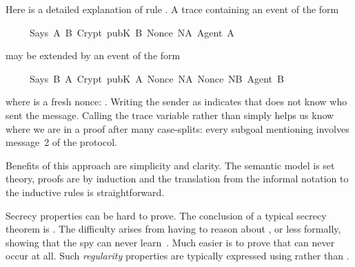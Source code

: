 \begin{isabellebody}
\begin{isamarkuptext}
Here is a detailed explanation of rule .
A trace containing an event of the form
\begin{isabelle}%
\ \ \ \ \ Says\ A{}\ B\ {}Crypt\ {}pubK\ B{}\ {}Nonce\ NA{}\ Agent\ A{}{}%
\end{isabelle}
may be extended by an event of the form
\begin{isabelle}%
\ \ \ \ \ Says\ B\ A\ {}Crypt\ {}pubK\ A{}\ {}Nonce\ NA{}\ Nonce\ NB{}\ Agent\ B{}{}%
\end{isabelle}
where  is a fresh nonce: .
Writing the sender as  indicates that  does not 
know who sent the message.  Calling the trace variable  rather
than simply  helps us know where we are in a proof after many
case-splits: every subgoal mentioning  involves message~2 of the
protocol.

Benefits of this approach are simplicity and clarity.  The semantic model
is set theory, proofs are by induction and the translation from the informal
notation to the inductive rules is straightforward.%
\end{isamarkuptext}%
\isamarkuptrue%
%
\isamarkuptrue%
%
\isadelimproof
%
\endisadelimproof
%
\isatagproof
%
\endisatagproof
{\isafoldproof}%
%
\isadelimproof
%
\endisadelimproof
%
\begin{isamarkuptext}%
Secrecy properties can be hard to prove.  The conclusion of a typical
secrecy theorem is 
.  The difficulty arises from
having to reason about , or less formally, showing that the spy
can never learn~.  Much easier is to prove that  can never
occur at all.  Such \emph{regularity} properties are typically expressed
using  rather than .


\end{isamarkuptext}
\end{isabellebody}
